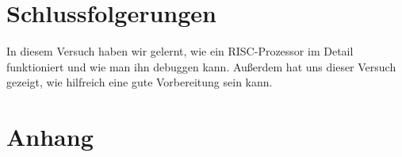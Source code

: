 \documentclass[12pt,a4paper]{scrartcl}
\begin{document}
\section{Schlussfolgerungen}
In diesem Versuch haben wir gelernt, wie ein RISC-Prozessor im Detail funktioniert und wie man ihn debuggen kann.
Au\ss erdem hat uns dieser Versuch gezeigt, wie hilfreich eine gute Vorbereitung sein kann.

\section{Anhang}

\end{document}
